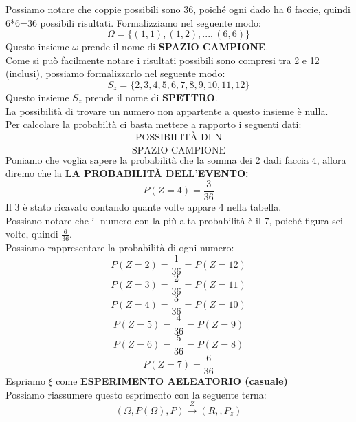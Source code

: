 Possiamo notare che coppie possibili sono 36, poiché ogni dado ha 6 faccie, quindi 6*6=36 possibili risultati.
Formalizziamo nel seguente modo: $$\Omega=\{(1,1), (1,2), ..., (6,6)\}$$
Questo insieme $\omega$ prende il nome di \textbf{SPAZIO CAMPIONE}.\\
Come si può facilmente notare i risultati possibili sono compresi tra 2 e 12 (inclusi), possiamo formalizzarlo nel seguente modo:
$$ S_z = \{2,3,4,5,6,7,8,9,10,11,12\} $$
Questo insieme $S_z$ prende il nome di \textbf{SPETTRO}.\\
La possibilità di trovare un numero non appartente a questo insieme è nulla.\\
Per calcolare la probabiltà ci basta mettere a rapporto i seguenti dati:
$$ \frac{\text{POSSIBILITÀ DI N}}{\text{SPAZIO CAMPIONE}} $$ 
Poniamo che voglia sapere la probabilità che la somma dei 2 dadi faccia 4, allora diremo che la \textbf{LA PROBABILITÀ DELL'EVENTO:}
$$ P(Z=4) = \frac{3}{36} $$
Il 3 è stato ricavato contando quante volte appare 4 nella tabella.\\
Possiano notare che il numero con la più alta probabilità è il 7, poiché figura sei volte, quindi $ \frac{6}{36} $.\\
Possiamo rappresentare la probabilità di ogni numero:
$$ P(Z=2) = \frac{1}{36} = P(Z=12) $$
$$ P(Z=3) = \frac{2}{36} = P(Z=11) $$
$$ P(Z=4) = \frac{3}{36} = P(Z=10) $$
$$ P(Z=5) = \frac{4}{36} = P(Z=9)  $$
$$ P(Z=6) = \frac{5}{36} = P(Z=8)  $$
$$ P(Z=7) = \frac{6}{36} $$
Espriamo $\xi$ come \textbf{ESPERIMENTO AELEATORIO (casuale)}\\
Possiamo riassumere questo esprimento con la seguente terna:
$$ (\Omega, P(\Omega), P) \xrightarrow[]{Z} (R, , P_z) $$

 




